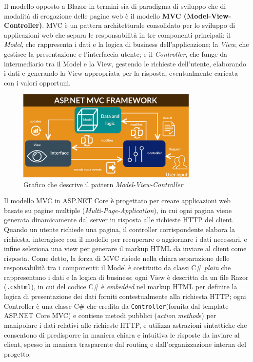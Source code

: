 Il modello opposto a Blazor in termini sia di paradigma di sviluppo che di modalità di erogazione delle pagine web è il modello \textbf{MVC (Model-View-Controller)}.
MVC è un pattern architetturale consolidato per lo sviluppo di applicazioni web che separa le responsabilità in tre componenti principali: il \emph{Model}, che rappresenta i dati e la logica di business dell'applicazione; la \emph{View}, che gestisce la presentazione e l'interfaccia utente; e il \emph{Controller}, che funge da intermediario tra il Model e la View, gestendo le richieste dell'utente, elaborando i dati e generando la View appropriata per la risposta, eventualmente caricata con i valori opportuni.
\begin{figure}[H]
    \centering
    \includegraphics[width=0.8\textwidth]{fig/dotnetMVC.jpg}
    \caption[Schema pattern MVC]{Grafico che descrive il pattern \emph{Model-View-Controller}}
\end{figure}
Il modello MVC in ASP.NET Core è progettato per creare applicazioni web basate su pagine multiple (\emph{Multi-Page-Application}), in cui ogni pagina viene generata dinamicamente dal server in risposta alle richieste HTTP del client. Quando un utente richiede una pagina, il controller corrispondente elabora la richiesta, interagisce con il modello per recuperare o aggiornare i dati necessari, e infine seleziona una view per generare il markup HTML da inviare al client come risposta.
Come detto, la forza di MVC risiede nella chiara separazione delle responsabilità tra i componenti: il Model è costituito da classi C\# \emph{plain} che rappresentano i dati e la logica di business; ogni View è descritta da un file Razor (\texttt{.cshtml}), in cui del codice C\# è \emph{embedded} nel markup HTML per definire la logica di presentazione dei dati forniti contestualmente alla richiesta HTTP; ogni Controller è una classe C\# che eredita da \texttt{Controller}(fornita dal template ASP.NET Core MVC) e contiene metodi pubblici (\emph{action method}s) per manipolare i dati relativi alle richieste HTTP, e utilizza astrazioni sintattiche che consentono di predisporre in maniera chiara e intuitiva le risposte da inviare al client, spesso in maniera trasparente dal routing e dall'organizzazione interna del progetto.
